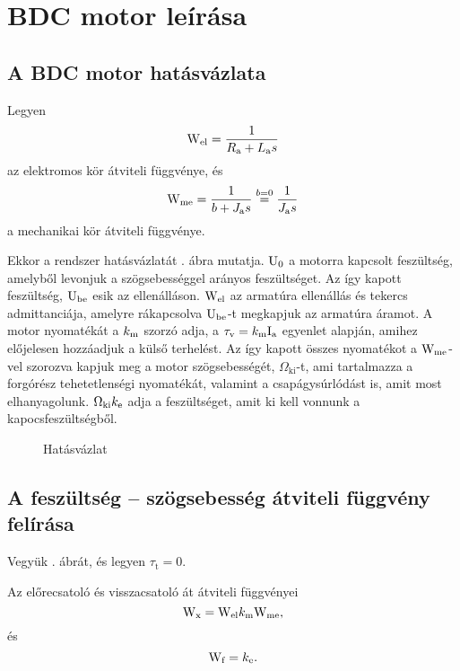 \section{BDC motor leírása}

\subsection{A BDC motor hatásvázlata}

Legyen
\begin{equation}
	\mathrm{W}_\text{el} = \frac{1}{R_\text{a}  + L_\text{a} s}
\end{equation}
az elektromos kör átviteli függvénye, és
\begin{equation}
	\mathrm{W}_\text{me} = \frac{1}{b + J_\text{a} s} \overset{b=0}{=} \frac{1}{J_\text{a} s}
\end{equation}
a mechanikai kör átviteli függvénye.

Ekkor a rendszer hatásvázlatát . ábra mutatja.
$\mathrm{U}_0$ a motorra kapcsolt feszültség, amelyből levonjuk a szögsebességgel arányos feszültséget.
Az így kapott feszültség, $\mathrm{U}_\text{be}$ esik az ellenálláson. $\mathrm{W}_\text{el}$ az armatúra
ellenállás és tekercs admittanciája, amelyre rákapcsolva $\mathrm{U}_\text{be}$-t megkapjuk az
armatúra áramot. A motor nyomatékát a $k_\text{m}$ szorzó adja, a $\tau_\text{v}=k_\text{m} \mathrm{I}_\text{a}$
egyenlet alapján, amihez előjelesen hozzáadjuk a külső terhelést. Az így kapott összes
nyomatékot a $\mathrm{W}_\text{me}$-vel szorozva kapjuk meg a motor szögsebességét,
$\Omega_\text{ki}$-t, ami tartalmazza a forgórész tehetetlenségi nyomatékát, valamint
a csapágysúrlódást is, amit most elhanyagolunk. $\Omega_\text{ki}k_\text{e}$ adja a feszültséget, 
amit ki kell vonnunk a kapocsfeszültségből.

\begin{figure}[h]
	\centering
	\caption{Hatásvázlat}
	\label{fig:hatasvazlat}
\end{figure}

\subsection{A feszültség -- szögsebesség átviteli függvény felírása}
\label{subsect:Wu-w}

Vegyük . ábrát, és legyen $\tau_\text{t}=0$.

Az előrecsatoló és visszacsatoló át átviteli függvényei
\begin{equation}
	\mathrm{W}_\text{x} = \mathrm{W}_\text{el}k_\text{m}\mathrm{W}_\text{me},
\end{equation} és 
\begin{equation}
	\mathrm{W}_\text{f} = k_\text{e}.
\end{equation}

